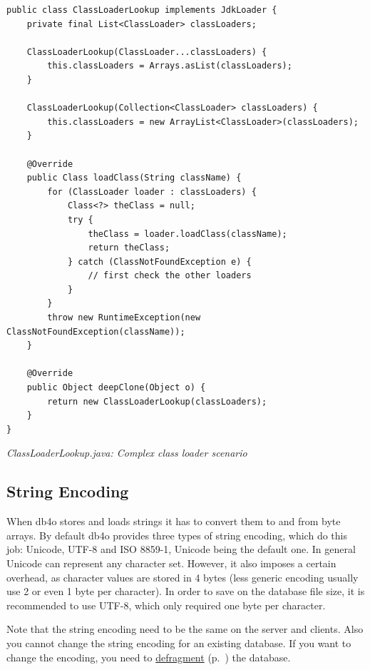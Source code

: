 \begin{lstlisting}
public class ClassLoaderLookup implements JdkLoader {
    private final List<ClassLoader> classLoaders;

    ClassLoaderLookup(ClassLoader...classLoaders) {
        this.classLoaders = Arrays.asList(classLoaders);
    }

    ClassLoaderLookup(Collection<ClassLoader> classLoaders) {
        this.classLoaders = new ArrayList<ClassLoader>(classLoaders);
    }

    @Override
    public Class loadClass(String className) {
        for (ClassLoader loader : classLoaders) {
            Class<?> theClass = null;
            try {
                theClass = loader.loadClass(className);
                return theClass;
            } catch (ClassNotFoundException e) {
                // first check the other loaders
            }
        }
        throw new RuntimeException(new ClassNotFoundException(className));
    }

    @Override
    public Object deepClone(Object o) {
        return new ClassLoaderLookup(classLoaders);
    }
}
\end{lstlisting}

{\small\itshape ClassLoaderLookup.java: Complex class loader scenario\par}
\medskip

\subsection{String Encoding}
\label{ref:configuration-common-string-encoding}

When db4o stores and loads strings it has to convert them to and from byte arrays. By default db4o provides three types of string encoding, which do this job: Unicode, UTF-8 and ISO 8859-1, Unicode being the default one. In general Unicode can represent any character set. However, it also imposes a certain overhead, as character values are stored in 4 bytes (less generic encoding usually use 2 or even 1 byte per character). In order to save on the database file size, it is recommended to use UTF-8, which only required one byte per character.

Note that the string encoding need to be the same on the server and clients. Also you cannot change the string encoding for an existing database. If you want to change the encoding, you need to \hyperref[ref:advanced-topics-defragment]{defragment} (p.~\pageref{ref:advanced-topics-defragment}) the database.

